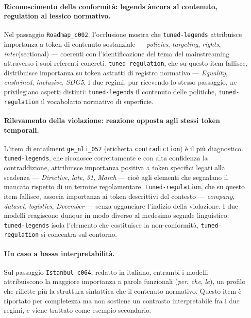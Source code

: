 \documentclass[pdflatex, sn-apa]{sn-jnl}%
\theoremstyle{thmstyleone}%
\theoremstyle{thmstyletwo}%
\theoremstyle{thmstylethree}%
\newcommand{\modellegends}{\texttt{tuned-legends}}
\newcommand{\modelreg}{\texttt{tuned-regulation}}
\begin{document}
\paragraph{Riconoscimento della conformità: legends àncora al contenuto,
regulation al lessico normativo.}
Nel passaggio \texttt{Roadmap\_c002}, l'occlusione mostra che \modellegends{}
attribuisce importanza a token di contenuto sostanziale --- \emph{policies},
\emph{targeting}, \emph{rights}, \emph{inter}(sectional) --- coerenti con
l'identificazione del tema del mainstreaming attraverso i suoi referenti concreti.
\modelreg{}, che su questo item fallisce, distribuisce importanza su token
astratti di registro normativo --- \emph{Equality}, \emph{enshrined},
\emph{inclusive}, \emph{SDG5}. I due regimi, pur ricevendo lo stesso passaggio, ne
privilegiano aspetti distinti: \modellegends{} il contenuto delle politiche,
\modelreg{} il vocabolario normativo di superficie.

\paragraph{Rilevamento della violazione: reazione opposta agli stessi token
temporali.}
L'item di entailment \texttt{ge\_nli\_057} (etichetta \texttt{contradiction}) è il
più diagnostico. \modellegends{}, che riconosce correttamente e con alta
confidenza la contraddizione, attribuisce importanza positiva a token specifici
legati alla scadenza --- \emph{Directive}, \emph{late}, \emph{31}, \emph{March} ---
cioè agli elementi che segnalano il mancato rispetto di un termine regolamentare.
\modelreg{}, che su questo item fallisce, associa importanza ai token descrittivi
del contesto --- \emph{company}, \emph{dataset}, \emph{logistics},
\emph{December} --- senza agganciare l'indizio della violazione. I due modelli
reagiscono dunque in modo diverso al medesimo segnale linguistico: \modellegends{}
isola l'elemento che costituisce la non-conformità, \modelreg{} si concentra sul
contorno.

\paragraph{Un caso a bassa interpretabilità.}
Sul passaggio \texttt{Istanbul\_c064}, redatto in italiano, entrambi i modelli
attribuiscono la maggiore importanza a parole funzionali (\emph{per}, \emph{che},
\emph{le}), un profilo che riflette più la struttura sintattica che il contenuto
normativo. Questo item è riportato per completezza ma non sostiene un contrasto
interpretabile fra i due regimi, e viene trattato come esempio secondario.
\end{document}
